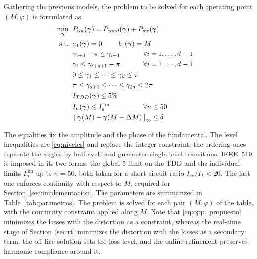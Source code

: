 \documentclass[conference]{IEEEtran}
\newcommand{\gv}{\boldsymbol{\gamma}}
\newcommand{\pct}{\text{\char`\%}}
\begin{document}
Gathering the previous models, the problem to be solved for each operating
point $(M,\varphi)$ is formulated as
\begin{subequations}
    \begin{align}
        \min_{\gv}\;\; & P_{tot}(\gv) = P_{cond}(\gv) + P_{sw}(\gv)\\
        \text{s.t.}\;\; & a_1(\gv) = 0, \qquad b_1(\gv) = M\\
        & \gamma_{i+d}-\pi \leq \gamma_{i+1}
            &&\hspace{-14mm}\forall i = 1,\dots,d-1\\
        & \gamma_{i} \leq \gamma_{i+d+1}-\pi
            &&\hspace{-14mm}\forall i = 1,\dots,d-1\\
        & 0 \leq \gamma_1 \leq \dots \leq \gamma_d \leq \pi\\
        & \pi \leq \gamma_{d+1} \leq \dots \leq \gamma_{2d} \leq 2\pi\\
        & I_{TDD}(\gv) \leq 5\pct\\
        & I_{n}(\gv) \leq I_{n}^{\text{lim}} &&\hspace{-14mm}\forall n \leq 50\\
        & \left\|\gv(M)-\gv(M-\Delta M)\right\|_{\infty} \leq \delta
    \end{align}
    \label{eq:opp_propuesto}
\end{subequations}

The equalities fix the amplitude and the phase of the fundamental. The level
inequalities are \eqref{eq:niveles} and replace the integer constraint; the
ordering ones separate the angles by half-cycle and guarantee single-level
transitions. IEEE~519 is imposed in its two forms: the global 5\pct{} limit on the TDD and
the individual limits $I_{n}^{\text{lim}}$ up to $n=50$, both taken for a
short-circuit ratio $I_{sc}/I_{L} < 20$. The last
one enforces continuity with respect to $M$, required for Section~\ref{sec:implementacion}. The
parameters are summarized in Table~\ref{tab:parametros}. The problem is
solved for each pair $(M,\varphi)$ of the table, with the continuity
constraint applied along $M$. Note that \eqref{eq:opp_propuesto} minimizes
the losses with the distortion as a constraint, whereas the real-time stage
of Section~\ref{sec:rt} minimizes the distortion with the losses as a
secondary term: the off-line solution sets the loss level, and the online
refinement preserves harmonic compliance around it.
\end{document}
